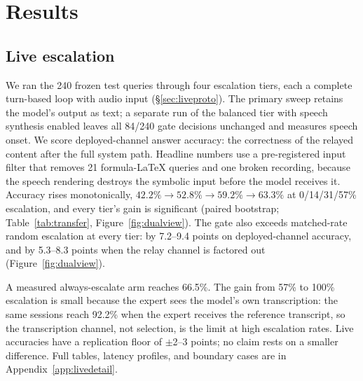 \section{Results}
\label{sec:results}


\subsection{Live escalation}
\label{sec:live}
\label{sec:liveloop}
\label{sec:livecurve}

We ran the 240 frozen test queries through four escalation tiers,
each a complete turn-based loop with audio input
(\S\ref{sec:liveproto}). The primary sweep retains the model's output
as text; a separate run of the balanced tier with speech synthesis
enabled leaves all 84/240 gate decisions unchanged and measures
speech onset. We score deployed-channel answer accuracy: the
correctness of the relayed content after the full system path.
Headline numbers use a pre-registered input filter that removes 21
formula-LaTeX queries and one broken recording, because the speech
rendering destroys the symbolic input before the model receives it.
Accuracy rises monotonically,
$\mathbf{42.2\% \to 52.8\% \to 59.2\% \to 63.3\%}$ at 0/14/31/57\%
escalation, and every tier's gain is significant (paired bootstrap;
Table~\ref{tab:transfer}, Figure~\ref{fig:dualview}). The gate also
exceeds matched-rate random
escalation at every tier: by 7.2--9.4 points on deployed-channel
accuracy, and by 5.3--8.3 points when the relay channel is factored
out (Figure~\ref{fig:dualview}).


A measured always-escalate arm reaches 66.5\%. The gain from 57\% to
100\% escalation is small because the expert sees the model's own
transcription: the same sessions reach 92.2\% when the expert
receives the reference transcript, so the transcription channel, not
selection, is the limit at high escalation rates. Live accuracies
have a replication floor of $\pm$2--3 points; no claim rests on a
smaller difference. Full tables, latency profiles, and boundary cases
are in Appendix~\ref{app:livedetail}.

